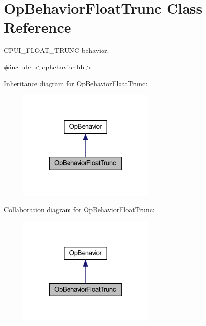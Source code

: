 \hypertarget{class_op_behavior_float_trunc}{}\section{Op\+Behavior\+Float\+Trunc Class Reference}
\label{class_op_behavior_float_trunc}


C\+P\+U\+I\+\_\+\+F\+L\+O\+A\+T\+\_\+\+T\+R\+U\+NC behavior.  




{\ttfamily \#include $<$opbehavior.\+hh$>$}



Inheritance diagram for Op\+Behavior\+Float\+Trunc\+:
\nopagebreak
\begin{figure}[H]
\begin{center}
\leavevmode
\includegraphics[width=192pt]{class_op_behavior_float_trunc__inherit__graph}
\end{center}
\end{figure}


Collaboration diagram for Op\+Behavior\+Float\+Trunc\+:
\nopagebreak
\begin{figure}[H]
\begin{center}
\leavevmode
\includegraphics[width=192pt]{class_op_behavior_float_trunc__coll__graph}
\end{center}
\end{figure}
